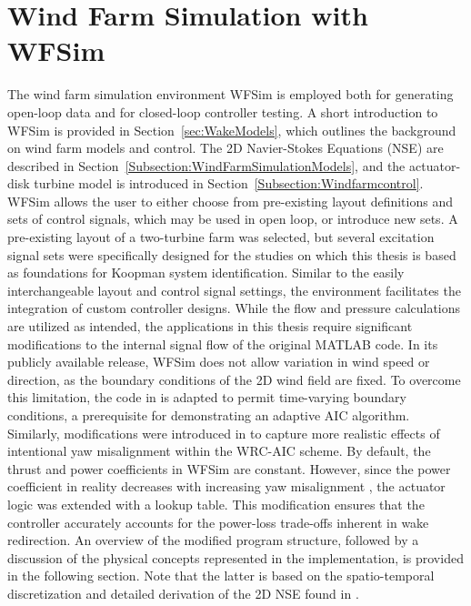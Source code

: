 \section{Wind Farm Simulation with WFSim} \label{sec:WindFarmSimulationWFSim}
The wind farm simulation environment WFSim \cite{boersma2017tutorial} is employed both for generating open-loop data and for closed-loop controller testing. A short introduction to WFSim is provided in Section~\ref{sec:WakeModels}, which outlines the background on wind farm models and control. The 2D Navier-Stokes Equations (NSE) are described in Section~\ref{Subsection:WindFarmSimulationModels}, and the actuator-disk turbine model is introduced in Section~\ref{Subsection:Windfarmcontrol}. WFSim allows the user to either choose from pre-existing layout definitions and sets of control signals, which may be used in open loop, or introduce new sets. A pre-existing layout of a two-turbine farm was selected, but several excitation signal sets were specifically designed for the studies on which this thesis is based as foundations for Koopman system identification. Similar to the easily interchangeable layout and control signal settings, the environment facilitates the integration of custom controller designs. While the flow and pressure calculations are utilized as intended, the applications in this thesis require significant modifications to the internal signal flow of the original MATLAB code.
In its publicly available release, WFSim does not allow variation in wind speed or direction, as the boundary conditions of the 2D wind field are fixed. To overcome this limitation, the code in \cite{dittmer2022data} is adapted to permit time-varying boundary conditions, a prerequisite for demonstrating an adaptive AIC algorithm. Similarly, modifications were introduced in \cite{dittmer2023koopman} to capture more realistic effects of intentional yaw misalignment within the WRC-AIC scheme. By default, the thrust and power coefficients in WFSim are constant. However, since the power coefficient in reality decreases with increasing yaw misalignment \cite{hulsman2022turbine}, the actuator logic was extended with a lookup table. This modification ensures that the controller accurately accounts for the power-loss trade-offs inherent in wake redirection. An overview of the modified program structure, followed by a discussion of the physical concepts represented in the implementation, is provided in the following section. Note that the latter is based on the spatio-temporal discretization and detailed derivation of the 2D NSE found in \cite{boersma2018control}.

